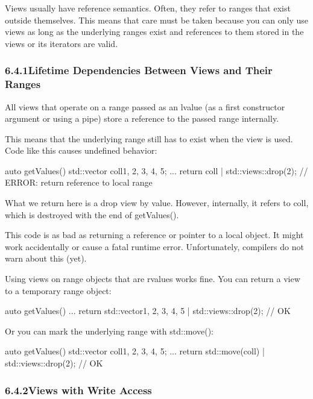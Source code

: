 
Views usually have reference semantics. Often, they refer to ranges that exist outside themselves. This means that care must be taken because you can only use views as long as the underlying ranges exist and references to them stored in the views or its iterators are valid.

\subsubsection*{ 6.4.1\hspace{0.2cm}Lifetime Dependencies Between Views and Their Ranges}

All views that operate on a range passed as an lvalue (as a first constructor argument or using a pipe) store a reference to the passed range internally.

This means that the underlying range still has to exist when the view is used. Code like this causes undefined behavior:

\begin{cpp}
auto getValues()
{
	std::vector coll{1, 2, 3, 4, 5};
	...
	return coll | std::views::drop(2); // ERROR: return reference to local range
}
\end{cpp}

What we return here is a drop view by value. However, internally, it refers to coll, which is destroyed with the end of getValues().

This code is as bad as returning a reference or pointer to a local object. It might work accidentally or cause a fatal runtime error. Unfortunately, compilers do not warn about this (yet).

Using views on range objects that are rvalues works fine. You can return a view to a temporary range object:

\begin{cpp}
auto getValues()
{
	...
	return std::vector{1, 2, 3, 4, 5} | std::views::drop(2); // OK
}
\end{cpp}

Or you can mark the underlying range with std::move():

\begin{cpp}
auto getValues()
{
	std::vector coll{1, 2, 3, 4, 5};
	...
	return std::move(coll) | std::views::drop(2); // OK
}
\end{cpp}

\subsubsection*{ 6.4.2\hspace{0.2cm}Views with Write Access}

